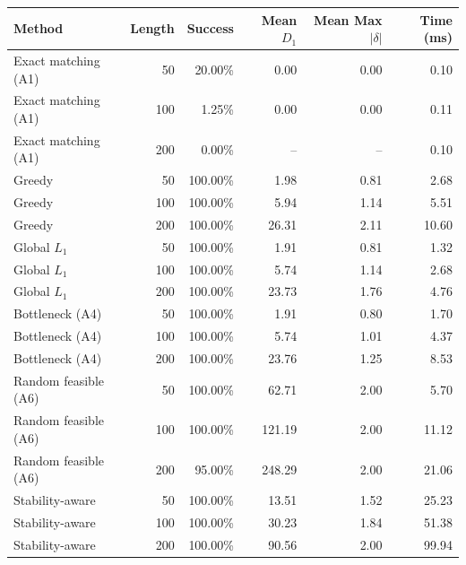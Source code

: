 \begin{tabular}{lrrrrr}
\toprule
\textbf{Method} & \textbf{Length} & \textbf{Success} & \textbf{Mean $D_1$} & \textbf{Mean Max $|\delta|$} & \textbf{Time (ms)} \\
\midrule
Exact matching (A1) & 50 & 20.00\% & 0.00 & 0.00 & 0.10 \\
Exact matching (A1) & 100 & 1.25\% & 0.00 & 0.00 & 0.11 \\
Exact matching (A1) & 200 & 0.00\% & -- & -- & 0.10 \\
Greedy & 50 & 100.00\% & 1.98 & 0.81 & 2.68 \\
Greedy & 100 & 100.00\% & 5.94 & 1.14 & 5.51 \\
Greedy & 200 & 100.00\% & 26.31 & 2.11 & 10.60 \\
Global $L_1$ & 50 & 100.00\% & 1.91 & 0.81 & 1.32 \\
Global $L_1$ & 100 & 100.00\% & 5.74 & 1.14 & 2.68 \\
Global $L_1$ & 200 & 100.00\% & 23.73 & 1.76 & 4.76 \\
Bottleneck (A4) & 50 & 100.00\% & 1.91 & 0.80 & 1.70 \\
Bottleneck (A4) & 100 & 100.00\% & 5.74 & 1.01 & 4.37 \\
Bottleneck (A4) & 200 & 100.00\% & 23.76 & 1.25 & 8.53 \\
Random feasible (A6) & 50 & 100.00\% & 62.71 & 2.00 & 5.70 \\
Random feasible (A6) & 100 & 100.00\% & 121.19 & 2.00 & 11.12 \\
Random feasible (A6) & 200 & 95.00\% & 248.29 & 2.00 & 21.06 \\
Stability-aware & 50 & 100.00\% & 13.51 & 1.52 & 25.23 \\
Stability-aware & 100 & 100.00\% & 30.23 & 1.84 & 51.38 \\
Stability-aware & 200 & 100.00\% & 90.56 & 2.00 & 99.94 \\
\bottomrule
\end{tabular}
